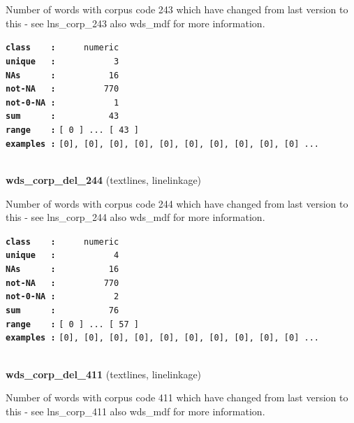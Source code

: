 \documentclass[]{article}
\begin{document}
Number of words with corpus code 243 which have changed from last
version to this - see lns\_corp\_243 also wds\_mdf for more information.

\textbf{\texttt{class\ \ \ \ :}} \texttt{~~~~~numeric}\\
\textbf{\texttt{unique\ \ \ :}} \texttt{~~~~~~~~~~~3}\\
\textbf{\texttt{NAs\ \ \ \ \ \ :}} \texttt{~~~~~~~~~~16}\\
\textbf{\texttt{not-NA\ \ \ :}} \texttt{~~~~~~~~~770}\\
\textbf{\texttt{not-0-NA\ :}} \texttt{~~~~~~~~~~~1}\\
\textbf{\texttt{sum\ \ \ \ \ \ :}} \texttt{~~~~~~~~~~43}\\
\textbf{\texttt{range\ \ \ \ :}}
\texttt{{[}\ 0\ {]}\ ...\ {[}\ 43\ {]}}\\
\textbf{\texttt{examples\ :}}
\texttt{{[}0{]},\ {[}0{]},\ {[}0{]},\ {[}0{]},\ {[}0{]},\ {[}0{]},\ {[}0{]},\ {[}0{]},\ {[}0{]},\ {[}0{]}\ ...}\\

~

\textbf{wds\_corp\_del\_244} (textlines, linelinkage)

Number of words with corpus code 244 which have changed from last
version to this - see lns\_corp\_244 also wds\_mdf for more information.

\textbf{\texttt{class\ \ \ \ :}} \texttt{~~~~~numeric}\\
\textbf{\texttt{unique\ \ \ :}} \texttt{~~~~~~~~~~~4}\\
\textbf{\texttt{NAs\ \ \ \ \ \ :}} \texttt{~~~~~~~~~~16}\\
\textbf{\texttt{not-NA\ \ \ :}} \texttt{~~~~~~~~~770}\\
\textbf{\texttt{not-0-NA\ :}} \texttt{~~~~~~~~~~~2}\\
\textbf{\texttt{sum\ \ \ \ \ \ :}} \texttt{~~~~~~~~~~76}\\
\textbf{\texttt{range\ \ \ \ :}}
\texttt{{[}\ 0\ {]}\ ...\ {[}\ 57\ {]}}\\
\textbf{\texttt{examples\ :}}
\texttt{{[}0{]},\ {[}0{]},\ {[}0{]},\ {[}0{]},\ {[}0{]},\ {[}0{]},\ {[}0{]},\ {[}0{]},\ {[}0{]},\ {[}0{]}\ ...}\\

~

\textbf{wds\_corp\_del\_411} (textlines, linelinkage)

Number of words with corpus code 411 which have changed from last
version to this - see lns\_corp\_411 also wds\_mdf for more information.
\end{document}
